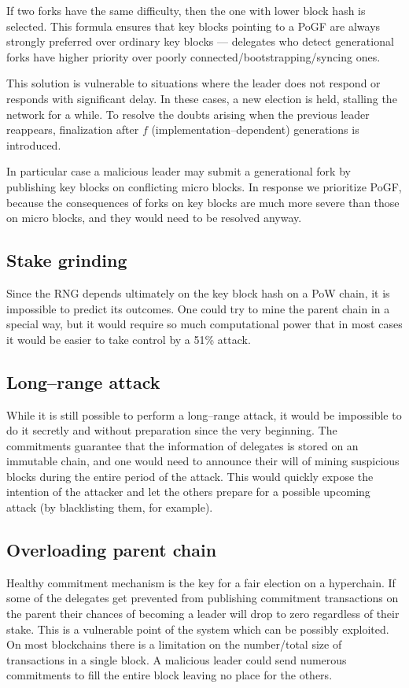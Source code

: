 If two forks have the same difficulty, then the one with lower block hash
is selected. This formula ensures that key blocks pointing to a PoGF are always
strongly preferred over ordinary key blocks — delegates who detect generational
forks have higher priority over poorly connected/bootstrapping/syncing ones.

This solution is vulnerable to situations where the leader does not respond
or responds with significant delay. In these cases, a new election is held,
stalling the network for a while. To resolve the doubts arising when the
previous leader reappears,
finalization after $f$ (implementation–dependent) generations is introduced.

In particular case a malicious leader may submit a generational
fork by publishing key blocks on conflicting micro blocks.
In response we prioritize PoGF, because the consequences of forks on
key blocks are much more severe than those on micro blocks, and they would need to
be resolved anyway.

\subsection{Stake grinding}

Since the RNG depends ultimately on the key block hash on a PoW chain, it is
impossible to predict its outcomes. One could try to mine the parent chain
in a special way, but it would require so much computational power that in
most cases it would be easier to take control by a 51\% attack.

\subsection{Long–range attack}
While it is still possible to perform a long–range attack, it would be impossible to do it
secretly and without preparation since the very beginning. The commitments
guarantee that the information of delegates is stored on an immutable chain,
and one would need to announce their will of mining suspicious blocks during
the entire period of the attack. This would quickly expose the intention of the attacker
and let the others prepare for a possible upcoming attack
(by blacklisting them, for example).

\subsection{Overloading parent chain}

Healthy commitment mechanism is the key for a fair election on a hyperchain. If
some of the delegates get prevented from publishing commitment transactions on
the parent their chances of becoming a leader will drop to zero regardless of
their stake. This is a vulnerable point of the system which can be possibly
exploited. On most blockchains there is a limitation on the number/total size
of transactions in a single block. A malicious leader could send numerous
commitments to fill the entire block leaving no place for the others.

